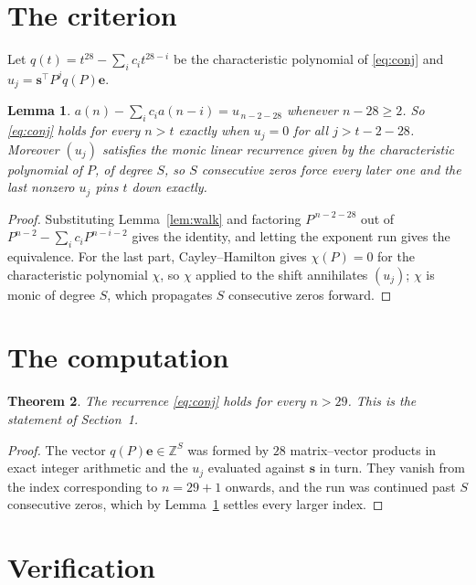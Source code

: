 \documentclass[11pt,a4paper]{article}
\theoremstyle{plain}
\newtheorem{theorem}{Theorem}
\newtheorem{lemma}[theorem]{Lemma}
\theoremstyle{definition}
\begin{document}
\section{The criterion}

Let $q(t)=t^{28}-\sum_i c_i t^{28-i}$ be the characteristic polynomial of
\eqref{eq:conj} and $u_j=\mathbf{s}^{\!\top}P^{j}q(P)\mathbf{e}$.

\begin{lemma}\label{lem:crit}
$a(n)-\sum_i c_i a(n-i)=u_{\,n-2-28}$ whenever $n-28\ge2$. So \eqref{eq:conj}
holds for every $n>t$ exactly when $u_j=0$ for all $j>t-2-28$. Moreover $(u_j)$
satisfies the monic linear recurrence given by the characteristic polynomial of $P$, of
degree $S$, so $S$ consecutive zeros force every later one and the last nonzero $u_j$ pins
$t$ down exactly.
\end{lemma}

\begin{proof}
Substituting Lemma~\ref{lem:walk} and factoring $P^{\,n-2-28}$ out of
$P^{n-2}-\sum_i c_i P^{n-i-2}$ gives the identity, and letting the exponent run gives the
equivalence. For the last part, Cayley--Hamilton gives $\chi(P)=0$ for the characteristic
polynomial $\chi$, so $\chi$ applied to the shift annihilates $(u_j)$; $\chi$ is monic of
degree $S$, which propagates $S$ consecutive zeros forward.
\end{proof}

\section{The computation}

\begin{theorem}
The recurrence \eqref{eq:conj} holds for every $n>29$. This is the statement of
Section~1.
\end{theorem}

\begin{proof}
The vector $q(P)\mathbf{e}\in\mathbb{Z}^{S}$ was formed by $28$ matrix--vector
products in exact integer arithmetic and the $u_j$ evaluated against $\mathbf{s}$ in turn.
They vanish from the index corresponding to $n=29+1$ onwards, and the run was continued
past $S$ consecutive zeros, which by Lemma~\ref{lem:crit} settles every larger index.
\end{proof}

\section{Verification}
\end{document}
